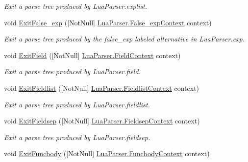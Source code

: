 \begin{DoxyCompactItemize}
\begin{DoxyCompactList}\small\item\em Exit a parse tree produced by Lua\+Parser.\+explist. \end{DoxyCompactList}\item 
void \mbox{\hyperlink{classzlua_1_1_compiler_a0e5e286cdb08d9d9ef551f10f4447cf4}{Exit\+False\+\_\+exp}} (\mbox{[}Not\+Null\mbox{]} \mbox{\hyperlink{classzlua_1_1_lua_parser_1_1_false__exp_context}{Lua\+Parser.\+False\+\_\+exp\+Context}} context)
\begin{DoxyCompactList}\small\item\em Exit a parse tree produced by the {\ttfamily false\+\_\+exp} labeled alternative in Lua\+Parser.\+exp. \end{DoxyCompactList}\item 
void \mbox{\hyperlink{classzlua_1_1_compiler_a169d31b8bd893ddc06b90184f76ecdc7}{Exit\+Field}} (\mbox{[}Not\+Null\mbox{]} \mbox{\hyperlink{classzlua_1_1_lua_parser_1_1_field_context}{Lua\+Parser.\+Field\+Context}} context)
\begin{DoxyCompactList}\small\item\em Exit a parse tree produced by Lua\+Parser.\+field. \end{DoxyCompactList}\item 
void \mbox{\hyperlink{classzlua_1_1_compiler_abff740fa28ffb3a5dfd363aff46825b1}{Exit\+Fieldlist}} (\mbox{[}Not\+Null\mbox{]} \mbox{\hyperlink{classzlua_1_1_lua_parser_1_1_fieldlist_context}{Lua\+Parser.\+Fieldlist\+Context}} context)
\begin{DoxyCompactList}\small\item\em Exit a parse tree produced by Lua\+Parser.\+fieldlist. \end{DoxyCompactList}\item 
void \mbox{\hyperlink{classzlua_1_1_compiler_a7a8e74fbfd05fe67a5f51db87236b3e8}{Exit\+Fieldsep}} (\mbox{[}Not\+Null\mbox{]} \mbox{\hyperlink{classzlua_1_1_lua_parser_1_1_fieldsep_context}{Lua\+Parser.\+Fieldsep\+Context}} context)
\begin{DoxyCompactList}\small\item\em Exit a parse tree produced by Lua\+Parser.\+fieldsep. \end{DoxyCompactList}\item 
void \mbox{\hyperlink{classzlua_1_1_compiler_a42142f05b01646d0b407f241fd406939}{Exit\+Funcbody}} (\mbox{[}Not\+Null\mbox{]} \mbox{\hyperlink{classzlua_1_1_lua_parser_1_1_funcbody_context}{Lua\+Parser.\+Funcbody\+Context}} context)

\end{DoxyCompactItemize}
